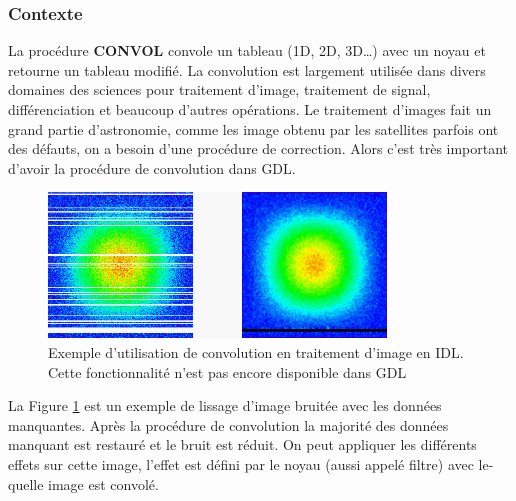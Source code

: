 \subsubsection{Contexte}
La procédure \textbf{CONVOL} convole un tableau (1D, 2D, 3D\ldots) avec un noyau et retourne un tableau modifié. La convolution est largement utilisée dans divers domaines des sciences pour traitement d'image, traitement de signal, différenciation et beaucoup d'autres opérations. Le traitement d'images fait un grand partie d'astronomie, comme les image obtenu par les satellites parfois ont des défauts, on a besoin d'une procédure de correction. Alors c'est très important d'avoir la procédure de convolution dans GDL.


\begin{figure}[!ht]
    \centerline{
    	\includegraphics[width=0.8\textwidth]{./images/convol_example2.png}
    	}
    \caption{Exemple d'utilisation de convolution en traitement d'image en IDL. Cette fonctionnalité n'est pas encore disponible dans GDL}
    \label{ex_convol_img}
\end{figure}

La Figure \ref{ex_convol_img} est un exemple de lissage d'image bruitée avec les données manquantes. Après la procédure de convolution la majorité des  données manquant est restauré et le bruit est réduit. On peut appliquer les différents effets sur cette image, l'effet est défini par le noyau (aussi appelé filtre) avec le-quelle image est convolé.

